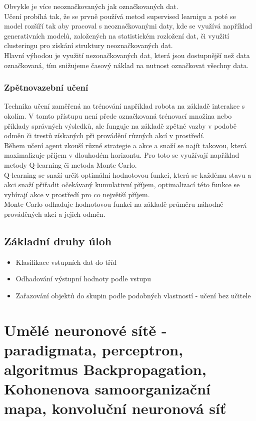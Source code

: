 Obvykle je více neoznačkovaných jak označkovaných dat.\\

Učení probíhá tak, že se prvně používá metod supervised learnigu a poté se model rozšíří tak aby pracoval s neoznačkovanými daty, kde se využívá například generativních modelů, založených na statistickém rozložení dat, či využití clusteringu pro získání struktury neoznačkovaných dat.\\

Hlavní výhodou je využití nezonačkovaných dat, která jsou dostupnější než data označkovaná, tím snižujeme časový náklad na nutnost označkovat všechny data.\\

\subsubsection{Zpětnovazební učení}
Technika učení zaměřená na trénování například robota na základě interakce s okolím. V tomto přístupu není přede označkovaná trénovací množina nebo příklady správných výsledků, ale funguje na základě zpětné vazby v podobě odměn či trestů získaných při provádění různých akcí v prostředí.\\
Během učení agent zkouší různé strategie a akce a snaží se najít takovou, která maximalizuje příjem v dlouhodém horizontu. Pro toto se využívají například metody Q-learning či metoda Monte Carlo.\\
Q-learning se snaží určit optimální hodnotovou funkci, která se každému stavu a akci snaží přiřadit očekávaný kumulativní příjem, optimalizací této funkce se vybírají akce v prostředí pro co největší příjem.\\
Monte Carlo odhaduje hodnotovou funkci na základě průměru náhodně prováděných akcí a jejich odměn.\\

\subsection{Základní druhy úloh}
\begin{itemize}
    \item Klasifikace vstupních dat do tříd
    \item Odhadování výstupní hodnoty podle vstupu
    \item Zařazování objektů do skupin podle podobných vlastností - učení bez učitele
\end{itemize}

\section{Umělé neuronové sítě - paradigmata, perceptron, algoritmus Backpropagation, Kohonenova samoorganizační mapa, konvoluční neuronová síť}
